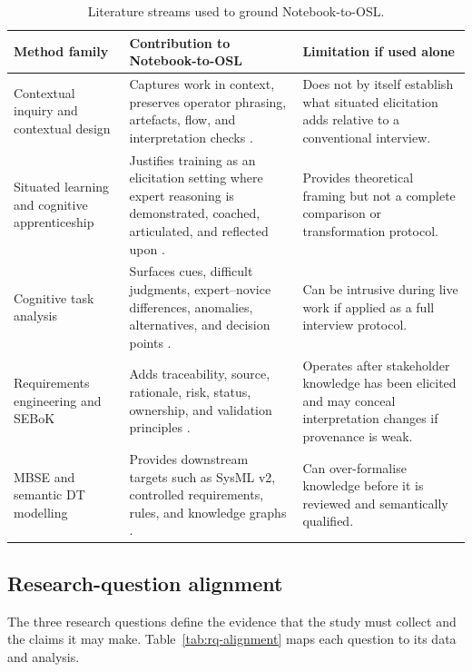 \begin{table}[htbp]
\centering
\caption{Literature streams used to ground Notebook-to-OSL.}
\label{tab:method-family-comparison}
\begin{tabularx}{\textwidth}{p{}p{}X}
\toprule
Method family & Contribution to Notebook-to-OSL & Limitation if used alone \\
\midrule
Contextual inquiry and contextual design & Captures work in context, preserves operator phrasing, artefacts, flow, and interpretation checks \cite{beyer1995apprenticing,beyer1997contextual}. & Does not by itself establish what situated elicitation adds relative to a conventional interview. \\
Situated learning and cognitive apprenticeship & Justifies training as an elicitation setting where expert reasoning is demonstrated, coached, articulated, and reflected upon \cite{lave1991situated,collins1989cognitive}. & Provides theoretical framing but not a complete comparison or transformation protocol. \\
Cognitive task analysis & Surfaces cues, difficult judgments, expert--novice differences, anomalies, alternatives, and decision points \cite{crandall2006workingminds,klein1989critical,stanik2021acta}. & Can be intrusive during live work if applied as a full interview protocol. \\
Requirements engineering and SEBoK & Adds traceability, source, rationale, risk, status, ownership, and validation principles \cite{vanlamsweerde2009requirements,sebokStakeholder,sebokRequirements}. & Operates after stakeholder knowledge has been elicited and may conceal interpretation changes if provenance is weak. \\
MBSE and semantic DT modelling & Provides downstream targets such as SysML v2, controlled requirements, rules, and knowledge graphs \cite{mavin2009ears,omgSysml2024,karabulut2023ontologies,listl2024knowledge}. & Can over-formalise knowledge before it is reviewed and semantically qualified. \\
\bottomrule
\end{tabularx}
\end{table}

\subsection{Research-question alignment}

The three research questions define the evidence that the study must collect and the claims it may make. Table~\ref{tab:rq-alignment} maps each question to its data and analysis.

